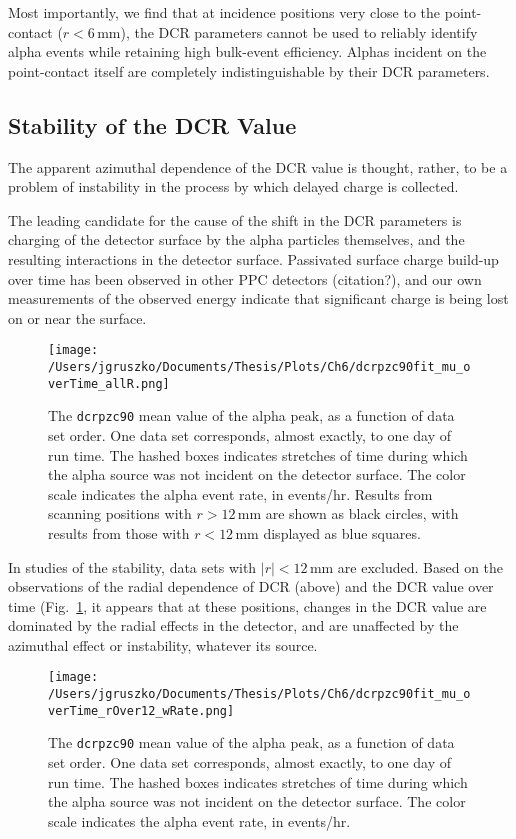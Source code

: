 Most importantly, we find that at incidence positions very close to the point-contact ($r<6$\,mm), the DCR parameters cannot be used to reliably identify alpha events while retaining high bulk-event efficiency. Alphas incident on the point-contact itself are completely indistinguishable by their DCR parameters.   

\subsection{Stability of the DCR Value}
The apparent azimuthal dependence of the DCR value is thought, rather, to be a problem of instability in the process by which delayed charge is collected. 

The leading candidate for the cause of the shift in the DCR parameters is charging of the detector surface by the alpha particles themselves, and the resulting interactions in the detector surface. Passivated surface charge build-up over time has been observed in other PPC detectors (citation?), and our own measurements of the observed energy indicate that significant charge is being lost on or near the surface.
 
\begin{figure}[t]
 \centering
 \texttt{[image: /Users/jgruszko/Documents/Thesis/Plots/Ch6/dcrpzc90fit\_mu\_overTime\_allR.png]}
 \caption[DCR scan results as a function of data set order, for all scanning positions]{The {\tt dcrpzc90} mean value of the alpha peak, as a function of data set order. One data set corresponds, almost exactly, to one day of run time. The hashed boxes indicates stretches of time during which the alpha source was not incident on the detector surface. The color scale indicates the alpha event rate, in events/hr. Results from scanning positions with $r>12$\,mm are shown as black circles, with results from those with $r<12$\,mm displayed as blue squares.} 
 \label{fig:DCRvT_all}
\end{figure}

In studies of the stability, data sets with $|r|<12$\,mm are excluded. Based on the observations of the radial dependence of DCR (above) and the DCR value over time (Fig.~\ref{fig:DCRvT_all}, it appears that at these positions, changes in the DCR value are dominated by the radial effects in the detector, and are unaffected by the azimuthal effect or instability, whatever its source. 

\begin{figure}[]
 \centering
 \texttt{[image: /Users/jgruszko/Documents/Thesis/Plots/Ch6/dcrpzc90fit\_mu\_overTime\_rOver12\_wRate.png]}
 \caption[DCR scan results as a function of data set order, for |r|>12\,mm, including rate information]{The {\tt dcrpzc90} mean value of the alpha peak, as a function of data set order. One data set corresponds, almost exactly, to one day of run time. The hashed boxes indicates stretches of time during which the alpha source was not incident on the detector surface. The color scale indicates the alpha event rate, in events/hr.} 
 \label{fig:DCRvT}
\end{figure}

